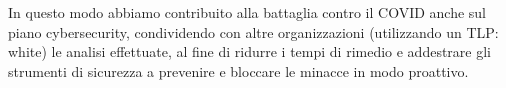 In questo modo abbiamo contribuito alla battaglia contro il COVID anche sul piano cybersecurity, condividendo con altre organizzazioni (utilizzando un TLP: white) le analisi effettuate, al fine di ridurre i tempi di rimedio e addestrare gli strumenti di sicurezza a prevenire e bloccare le minacce in modo proattivo.
